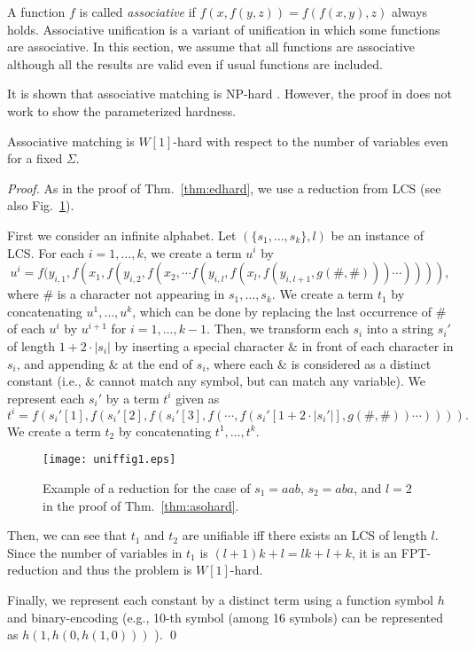 \documentclass[a4paper]{llncs}
\begin{document}
A function $f$ is called \emph{associative} if
$f(x,f(y,z))=f(f(x,y),z)$ always holds.
Associative unification is a variant of unification
in which some functions are associative.
In this section, we assume that all functions are associative
although all the results are valid even if usual functions are included.

It is shown that associative matching is NP-hard \cite{benanav87}.
However, the proof in \cite{benanav87} does not work to show
the parameterized hardness.

\begin{theorem}
Associative matching is $W[1]$-hard with respect to the number of variables
even for a fixed $\Sigma$.
\label{thm:asohard}
\end{theorem}
\begin{proof}
As in the proof of Thm.~\ref{thm:edhard},
we use a reduction from LCS (see also Fig.~\ref{fig:asohard}).

First we consider an infinite alphabet.
Let $(\{s_1,\ldots,s_k\},l)$ be an instance of LCS.
For each $i=1,\ldots,k$, we create a term $u^i$ by
\[
u^i = 
f(y_{i,1},f(x_1,f(y_{i,2},f(x_2,\cdots f(y_{i,l},f(x_l,f(y_{i,l+1},g(\#,\#)))
\cdots )))),
\]
where $\#$ is a character not appearing in $s_1,\ldots,s_k$.
We create a term $t_1$ by concatenating $u^1,\ldots,u^k$, which can be done
by replacing the last occurrence of $\#$ of each
$u^i$ by $u^{i+1}$ for $i=1,\ldots,k-1$.
Then, we transform each $s_i$ into a string $s_i'$ of length
$1 + 2 \cdot |s_i|$ by inserting a special character $\&$ 
in front of each character in $s_i$, and appending $\&$
at the end of $s_i$,
where each $\&$ is considered as a distinct constant
(i.e., $\&$ cannot match any symbol, but can match any variable).
We represent each $s_i'$ by a term $t^i$ given as
\[
t^i =
f(s_i'[1],f(s_i'[2],f(s_i'[3],f(\cdots,f(s_i'[1+2\cdot |s_i'|],g(\#,\#))
\cdots)))).
\]
We create a term $t_2$ by concatenating $t^1,\ldots,t^k$.

\begin{figure}[ht]
\begin{center}
\texttt{[image: uniffig1.eps]}
\caption{Example of a reduction for the case of $s_1=aab$, $s_2=aba$,
and $l=2$ in the proof of Thm.~\ref{thm:asohard}.}
\label{fig:asohard}
\end{center}
\end{figure}

Then, we can see that $t_1$ and $t_2$ are unifiable
iff there exists an LCS of length $l$.
Since the number of variables in $t_1$ is $(l+1)k+l=lk+l+k$,
it is an FPT-reduction and thus the problem is $W[1]$-hard.

Finally, we represent each constant by a distinct term using
a function symbol $h$ and binary-encoding 
(e.g., 10-th symbol (among 16 symbols) can be represented as
$h(1,h(0,h(1,0)))$ ).
\qed
\end{proof}
\end{document}
